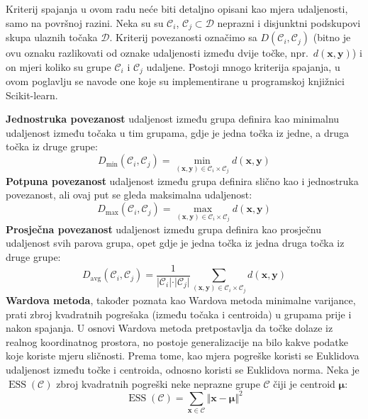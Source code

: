 \documentclass[times, utf8, zavrsni]{fer}
\begin{document}
Kriterij spajanja u ovom radu neće biti detaljno opisani kao mjera udaljenosti, samo na površnoj razini. Neka su su $\mathcal{C}_i$, $\mathcal{C}_j \subset \mathcal{D}$ neprazni i disjunktni podskupovi skupa ulaznih točaka $\mathcal{D}$. Kriterij povezanosti označimo sa $D \left(\mathcal{C}_i, \mathcal{C}_j\right)$ (bitno je ovu oznaku razlikovati od oznake udaljenosti između dvije točke, npr.\ $d \left(\mathbf{x}, \mathbf{y}\right)$) i on mjeri koliko su grupe $\mathcal{C}_i$ i $\mathcal{C}_j$ udaljene. Postoji mnogo kriterija spajanja, u ovom poglavlju se navode one koje su implementirane u programskoj knjižnici Scikit-learn.

\textbf{Jednostruka povezanost}  udaljenost između grupa definira kao minimalnu udaljenost između točaka u tim grupama, gdje je jedna točka iz jedne, a druga točka iz druge grupe:
\[D_{\text{min}} \left( \mathcal{C}_i, \mathcal{C}_j \right) 
        = \min_{\left(\mathbf{x}, \mathbf{y}\right) \in \mathcal{C}_i \times \mathcal{C}_j} d\left(\mathbf{x}, \mathbf{y}\right)
\]
\textbf{Potpuna povezanost}  udaljenost između grupa definira slično kao i jednostruka povezanost, ali ovaj put se gleda maksimalna udaljenost:
\[D_{\text{max}} \left( \mathcal{C}_i, \mathcal{C}_j \right) 
        = \max_{\left(\mathbf{x}, \mathbf{y}\right) \in \mathcal{C}_i \times \mathcal{C}_j} d\left(\mathbf{x}, \mathbf{y}\right)
\]
\textbf{Prosječna povezanost}  udaljenost između grupa definira kao prosječnu udaljenost svih parova grupa, opet gdje je jedna točka iz jedna druga točka iz druge grupe:
\[D_{\text{avg}} \left( \mathcal{C}_i, \mathcal{C}_j \right) 
        = \frac{1}{\vert \mathcal{C}_i \vert \cdot \vert \mathcal{C}_j \vert} 
            \sum_{\left(\mathbf{x}, \mathbf{y}\right) \in \mathcal{C}_i \times \mathcal{C}_j} d\left(\mathbf{x}, \mathbf{y}\right)
\]
\textbf{Wardova metoda}, također poznata kao Wardova metoda minimalne varijance, prati zbroj kvadratnih pogrešaka (između točaka i centroida) u grupama prije i nakon spajanja. U osnovi Wardova metoda pretpostavlja da točke dolaze iz realnog koordinatnog prostora, no postoje generalizacije na bilo kakve podatke koje koriste mjeru sličnosti. Prema tome, kao mjera pogreške koristi se Euklidova udaljenost između točke i centroida, odnosno koristi se Euklidova norma. Neka je $\operatorname{ESS} \left(\mathcal{C}\right)$ zbroj kvadratnih pogreški  neke neprazne grupe $\mathcal{C}$ čiji je centroid $\boldsymbol{\mu}$:
\[\operatorname{ESS} \left(\mathcal{C}\right) = \sum_{\mathbf{x} \in \mathcal{C}} 
\Vert \mathbf{x} - \boldsymbol{\mu} \Vert^2\]
\end{document}
